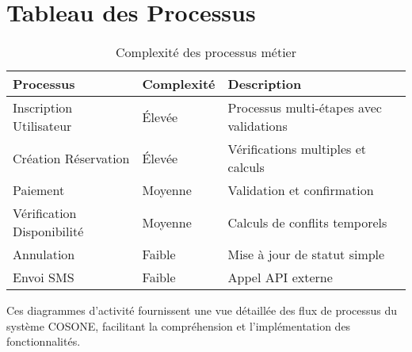\documentclass[12pt,a4paper]{article}
\begin{document}
\section{Tableau des Processus}

\begin{table}[h]
\centering
\begin{tabular}{|l|l|p{8cm}|}
\hline
\textbf{Processus} & \textbf{Complexité} & \textbf{Description} \\
\hline
Inscription Utilisateur & Élevée & Processus multi-étapes avec validations \\
\hline
Création Réservation & Élevée & Vérifications multiples et calculs \\
\hline
Paiement & Moyenne & Validation et confirmation \\
\hline
Vérification Disponibilité & Moyenne & Calculs de conflits temporels \\
\hline
Annulation & Faible & Mise à jour de statut simple \\
\hline
Envoi SMS & Faible & Appel API externe \\
\hline
\end{tabular}
\caption{Complexité des processus métier}
\end{table}

Ces diagrammes d'activité fournissent une vue détaillée des flux de processus du système COSONE, facilitant la compréhension et l'implémentation des fonctionnalités.
\end{document}
